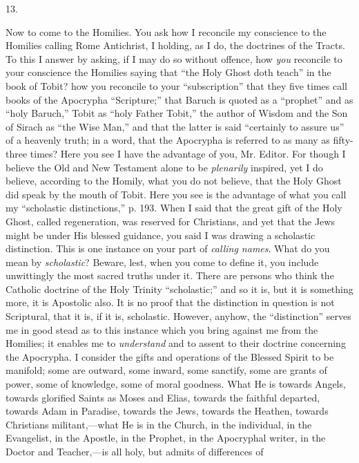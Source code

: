 13.

Now to come to the Homilies. You ask how I
reconcile my conscience to the Homilies calling Rome Antichrist, I
holding, as I do, the doctrines of the Tracts. To this I answer by
asking, if I may do so without offence, how \emph{you} reconcile to
your conscience the Homilies saying that ``the Holy Ghost doth teach''
in the book of Tobit? how you reconcile to your ``subscription'' that
they five times call books of the Apocrypha ``Scripture;'' that Baruch
is quoted as a ``prophet'' and as ``holy Baruch,'' Tobit as ``holy Father
Tobit,'' the author of Wisdom and the Son of Sirach as ``the Wise
Man,'' and that the latter is said ``certainly to assure us'' of a
heavenly truth; in a word, that the Apocrypha is referred to as many
as fifty-three times? Here you see I have the advantage of you, Mr.
Editor. For though I believe the Old and New Testament alone to be \emph{plenarily}
inspired, yet I do believe, according to the Homily, what you do not
believe, that the Holy Ghost did speak by the mouth of Tobit. Here you
see is the advantage of what you call my ``scholastic
distinctions,'' p. 193. When I said that the great gift of the
Holy Ghost, called regeneration, was reserved for Christians, and yet
that the Jews might be under His blessed guidance, you said I was
drawing a scholastic distinction. This is one instance on your part of
\emph{calling names}. What do you mean by \emph{scholastic}? Beware,
lest, when you come to define it, you include unwittingly the most sacred truths under it. There are persons who think the Catholic
doctrine of the Holy Trinity ``scholastic;'' and so it is, but it is
something more, it is Apostolic also. It is no proof that the
distinction in question is not Scriptural, that it is, if it is,
scholastic. However, anyhow, the ``distinction'' serves me in good stead
as to this instance which you bring against me from the Homilies; it
enables me to \emph{understand} and to assent to their doctrine
concerning the Apocrypha. I consider the gifts and operations of the
Blessed Spirit to be manifold; some are outward, some inward, some
sanctify, some are grants of power, some of knowledge, some of moral
goodness. What He is towards Angels, towards glorified Saints as Moses
and Elias, towards the faithful departed, towards Adam in Paradise,
towards the Jews, towards the Heathen, towards Christians
militant,—what He is in the Church, in the individual, in the
Evangelist, in the Apostle, in the Prophet, in the Apocryphal writer,
in the Doctor and Teacher,—is all holy, but admits of differences of
